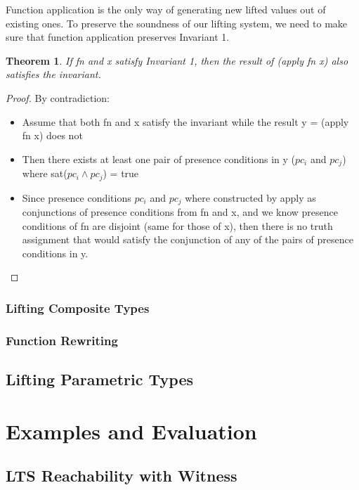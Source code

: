 \documentclass[11pt]{article} %
\begin{document}
Function application is the only way of generating new lifted values out of existing ones. To preserve the soundness of our lifting system, we need to make sure that function application preserves Invariant 1. 

\newtheorem{th1}{Theorem}
\begin{th1}
If fn and x satisfy Invariant 1, then the result of (apply fn x) also satisfies the invariant.
\end{th1}

\begin{proof}

By contradiction:

\begin{itemize}
\item Assume that both fn and x satisfy the invariant while the result y = (apply fn x) does not
\item Then there exists at least one pair of presence conditions in y ($pc_i$ and $pc_j$) where sat($pc_i \wedge pc_j$) = true
\item Since presence conditions $pc_i$ and $pc_j$ where constructed by apply as conjunctions of presence conditions from fn and x, and we know presence conditions of fn are disjoint (same for those of x), then there is no truth assignment that would satisfy the conjunction of any of the pairs of presence conditions in y.
\end{itemize}

\end{proof}

\subsubsection{Lifting Composite Types}

\subsubsection{Function Rewriting}

\subsection{Lifting Parametric Types}

\section{Examples and Evaluation}

\subsection{LTS Reachability with Witness}
\end{document}
